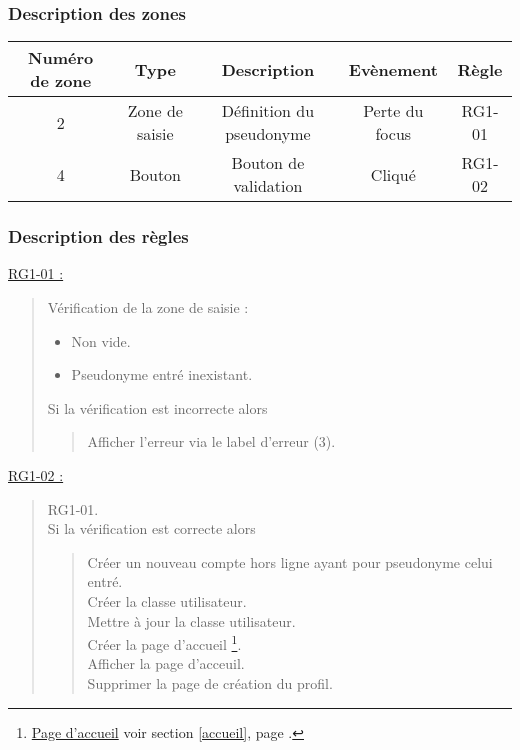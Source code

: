 \documentclass{report}
\begin{document}
		\subsubsection{Description des zones}
				
			\begin{tabular}{|c|c|c|c|c|} \hline
				Numéro de zone & Type  & Description & Evènement &	Règle \\\hline 
				2 & Zone de saisie & Définition du pseudonyme & Perte du focus & RG1-01 \\\hline
				4 & Bouton         & Bouton de validation     & Cliqué & RG1-02 \\\hline
			\end{tabular}

		\subsubsection{Description des règles}
		
		\underline{RG1-01 :}
			\begin{quote}
				Vérification de la zone de saisie :
				\begin{itemize}
				  \item Non vide.
				  \item Pseudonyme entré inexistant.
				\end{itemize}
				Si la vérification est incorrecte alors
				\begin{quote}
					Afficher l'erreur via le label d'erreur (3).
				\end{quote}
			\end{quote}
			
		\underline{RG1-02 :}
			\begin{quote}
				RG1-01.\\
				Si la vérification est correcte alors
				\begin{quote}
					Créer un nouveau compte hors ligne ayant pour pseudonyme celui entré.\\
					Créer la classe utilisateur.\\
					Mettre à jour la classe utilisateur.\\
					Créer la page d'accueil%
						\footnote[1]{
							\hyperlink{Page d'accueil}{Page d'accueil}
							\og voir section \ref{accueil}, page \pageref{accueil}.\fg
						}.\\
					Afficher la page d'acceuil\footnotemark[1].\\
					Supprimer la page de création du profil.
				\end{quote}
			\end{quote}
	
\end{document}
